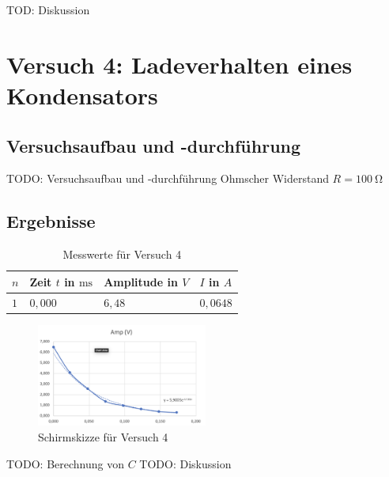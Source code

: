         TOD: Diskussion

\section{Versuch 4: Ladeverhalten eines Kondensators}

    \subsection{Versuchsaufbau und -durchführung}

        TODO: Versuchsaufbau und -durchführung
        Ohmscher Widerstand $R = 100\ \mathrm{\Omega}$

    \subsection{Ergebnisse}
        
        \begin{table}[h!]
            \centering
            \begin{tabular}{|l|l|l|l|}
                \hline
                $n$ & Zeit $t$ in $\mathrm{ms}$ & Amplitude in $V$ & $I$ in $A$\\
                \hline\hline
                $1$ & $0,000$ & $6,48$ & $0,0648$\\
                \hline
            \end{tabular}
            \caption{Messwerte für Versuch 4}
            \label{tab:versuch4}
        \end{table}

        \begin{figure}[h!]
            \centering
            \includegraphics[width=0.5\textwidth]{bilder/Physik_05.png}
            \caption{Schirmskizze für Versuch 4}
            \label{fig:versuch4}
        \end{figure}

        TODO: Berechnung von $C$
        TODO: Diskussion